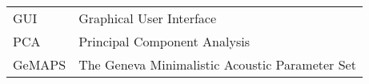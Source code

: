 \begin{longtable}{p{3cm}p{10cm}}
GUI&Graphical User Interface\\
PCA&Principal Component Analysis\\
GeMAPS&The Geneva Minimalistic Acoustic Parameter Set\\
\end{longtable}
\addtocounter{table}{-1} 